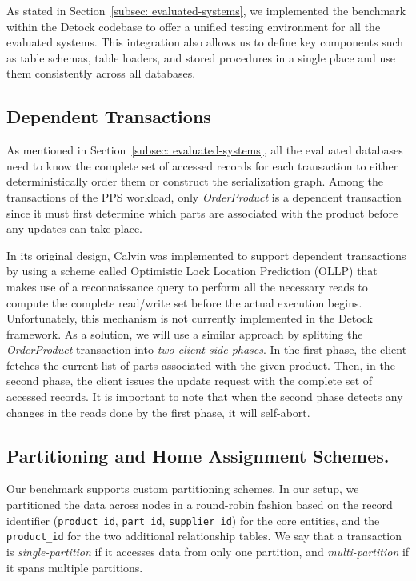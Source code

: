 \documentclass{article}
\begin{document}
As stated in Section~\ref{subsec: evaluated-systems}, we implemented the benchmark within the Detock codebase to offer a unified testing environment for all the evaluated systems. This integration also allows us to define key components such as table schemas, table loaders, and stored procedures in a single place and use them consistently across all databases.

\subsection{Dependent Transactions}
\label{subsec: dependent-transactions}
As mentioned in Section~\ref{subsec: evaluated-systems}, all the evaluated databases need to know the complete set of accessed records for each transaction to either deterministically order them or construct the serialization graph. Among the transactions of the PPS workload, only \textit{OrderProduct} is a dependent transaction since it must first determine which parts are associated with the product before any updates can take place.

In its original design, Calvin was implemented to support dependent transactions by using a scheme called Optimistic Lock Location Prediction (OLLP) that makes use of a reconnaissance query to perform all the necessary reads to compute the complete read/write set before the actual execution begins. Unfortunately, this mechanism is not currently implemented in the Detock framework. As a solution, we will use a similar approach by splitting the \textit{OrderProduct} transaction into \textit{two client-side phases}. In the first phase, the client fetches the current list of parts associated with the given product. Then, in the second phase, the client issues the update request with the complete set of accessed records. It is important to note that when the second phase detects any changes in the reads done by the first phase, it will self-abort.

\subsection{Partitioning and Home Assignment Schemes.}
\label{subsec: partitioning-and-home-assignment-schemes}
Our benchmark supports custom partitioning schemes. In our setup, we partitioned the data across nodes in a round-robin fashion based on the record identifier (\texttt{product\_id}, \texttt{part\_id}, \texttt{supplier\_id}) for the core entities, and the \texttt{product\_id} for the two additional relationship tables. We say that a transaction is \textit{single-partition} if it accesses data from only one partition, and \textit{multi-partition} if it spans multiple partitions.
\end{document}
